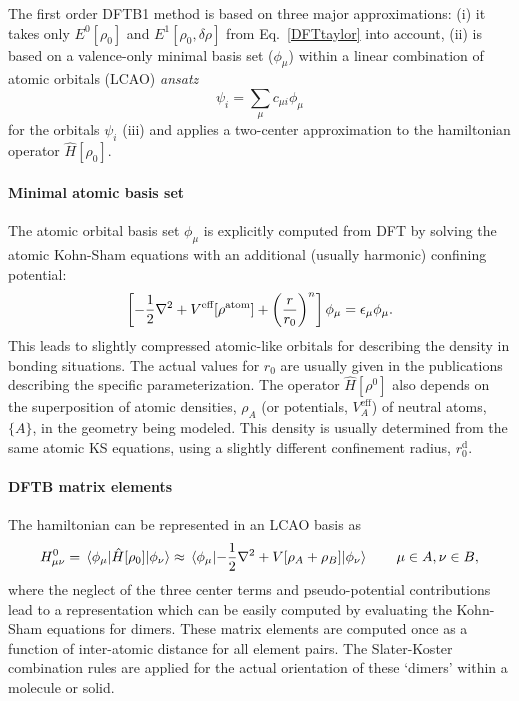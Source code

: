 \documentclass[reprint,onecolumn,superscriptaddress]{revtex4-1}
\begin{document}
The first order DFTB1 method is based on three major approximations: (i) it
takes only $E^0[\rho_0]$ and $ E^1[\rho_0,\delta \rho]$ from
Eq.~\eqref{DFTtaylor} into account, (ii) is based on a valence-only minimal
basis set ($\phi_\mu$) within a linear combination of atomic orbitals (LCAO)
{\it ansatz}
\begin{equation}
  \psi_i=\sum_\mu c_{\mu i}\phi_\mu
\end{equation}
for the orbitals $\psi_i$ (iii) and applies a two-center approximation to the
hamiltonian operator $\hat{H}[\rho_0]$.

\paragraph{Minimal atomic basis set}
The atomic orbital basis set $\phi_\mu$ is explicitly computed from DFT by
solving the atomic Kohn-Sham equations with an additional (usually harmonic)
confining potential:
\begin{equation}
  \left[ -\frac{1}{2} \nabla^2 + V^{\mbox{\scriptsize
        eff}}[\rho^{\mbox{\scriptsize atom}}] + \left( \frac{r}{r_0}\right)^n
    \right] \phi_{\mu} = \epsilon_{\mu} \phi_{\mu} \text.\label{eqn:DFTBatom}
\end{equation}
This leads to slightly compressed atomic-like orbitals for describing the
density in bonding situations. The actual values for $r_0$ are usually given in
the publications describing the specific parameterization.  The operator
$\hat{H}[\rho^0]$ also depends on the superposition of atomic densities,
$\rho_A$ (or potentials, $V_A^\text{eff}$) of neutral atoms, $\{A\}$, in the
geometry being modeled.  This density is usually determined from the same atomic
KS equations, using a slightly different confinement radius, $r_0^\text{d}$.


\paragraph{DFTB matrix elements}

The hamiltonian can be represented in an LCAO basis as
\begin{eqnarray}
  H_{\mu\nu}^0 = \mel{\phi_{\mu}}{\hat{H}[\rho_0]}{\phi_{\nu}} \approx
  \mel{\phi_{\mu}}{- \frac{1}{2} \nabla^2 +V[\rho_A +
      \rho_B]}{\phi_{\nu}}\qquad{\mu \in A, \nu \in B},
  \label{eqn:matelements}
\end{eqnarray}
where the neglect of the three center terms and pseudo-potential
contributions~\cite{ElstnerSeifertBBA2014} lead to a representation which can be
easily computed by evaluating the Kohn-Sham equations for dimers. These matrix
elements are computed once as a function of inter-atomic distance for all element
pairs. The Slater-Koster~\cite{PhysRev.94.1498} combination rules are applied for
the actual orientation of these `dimers' within a molecule or solid.
\end{document}
